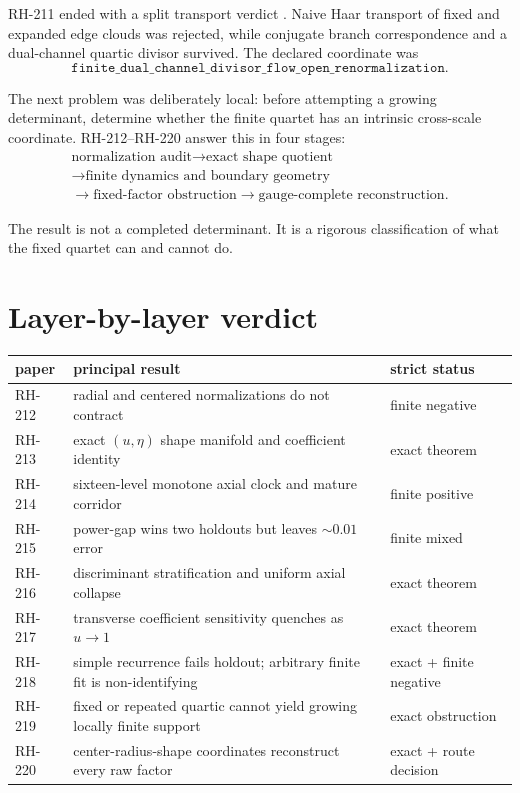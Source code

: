 \documentclass[12pt]{article}
\theoremstyle{remark}\newtheorem{remark}[theorem]{Remark}
\begin{document}
RH-211 ended with a split transport verdict \citep{WangRH211}.  Naive Haar
transport of fixed and expanded edge clouds was rejected, while conjugate
branch correspondence and a dual-channel quartic divisor survived.  The
declared coordinate was
\begin{equation*}
 \texttt{finite\_dual\_channel\_divisor\_flow\_open\_renormalization}.
\end{equation*}

The next problem was deliberately local: before attempting a growing
determinant, determine whether the finite quartet has an intrinsic
cross-scale coordinate.  RH-212--RH-220 answer this in four stages:
\begin{equation}\label{eq:batchroute}
 \begin{gathered}
 \text{normalization audit}
 \longrightarrow \text{exact shape quotient}\\
 \longrightarrow \text{finite dynamics and boundary geometry}\\
 \longrightarrow \text{fixed-factor obstruction}
 \longrightarrow \text{gauge-complete reconstruction}.
 \end{gathered}
\end{equation}

The result is not a completed determinant.  It is a rigorous classification
of what the fixed quartet can and cannot do.

\section{Layer-by-layer verdict}

\begin{center}
\small
\begin{tabular}{p{}p{}p{}}
\toprule
paper & principal result & strict status\\
\midrule
RH-212 & radial and centered normalizations do not contract & finite negative\\
RH-213 & exact $(u,\eta)$ shape manifold and coefficient identity & exact theorem\\
RH-214 & sixteen-level monotone axial clock and mature corridor & finite positive\\
RH-215 & power-gap wins two holdouts but leaves $\sim0.01$ error & finite mixed\\
RH-216 & discriminant stratification and uniform axial collapse & exact theorem\\
RH-217 & transverse coefficient sensitivity quenches as $u\to1$ & exact theorem\\
RH-218 & simple recurrence fails holdout; arbitrary finite fit is non-identifying & exact + finite negative\\
RH-219 & fixed or repeated quartic cannot yield growing locally finite support & exact obstruction\\
RH-220 & center-radius-shape coordinates reconstruct every raw factor & exact + route decision\\
\bottomrule
\end{tabular}
\end{center}
\end{document}
